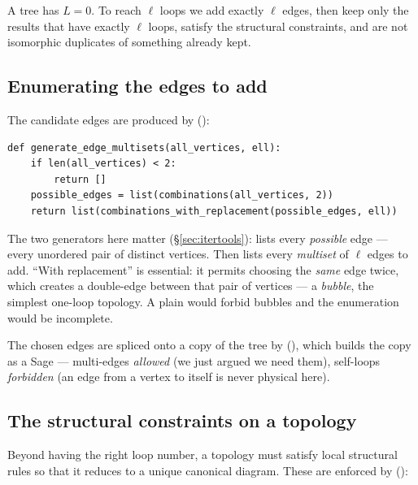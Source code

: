 A tree has $L=0$. To reach $\ell$ loops we add exactly $\ell$ edges, then keep
only the results that have exactly $\ell$ loops, satisfy the structural
constraints, and are not isomorphic duplicates of something already kept.

\subsection{Enumerating the edges to add}

The candidate edges are produced by 
():

\begin{lstlisting}
def generate_edge_multisets(all_vertices, ell):
    if len(all_vertices) < 2:
        return []
    possible_edges = list(combinations(all_vertices, 2))
    return list(combinations_with_replacement(possible_edges, ell))
\end{lstlisting}

The two  generators here matter (\S\ref{sec:itertools}):
 lists every \emph{possible} edge --- every
unordered pair of distinct vertices. Then
 lists every
\emph{multiset} of $\ell$ edges to add. ``With replacement'' is essential: it
permits choosing the \emph{same} edge twice, which creates a double-edge between
that pair of vertices --- a \emph{bubble}, the simplest one-loop topology. A
plain  would forbid bubbles and the enumeration would be
incomplete.

The chosen edges are spliced onto a copy of the tree by 
(), which builds the copy as a Sage
 --- multi-edges \emph{allowed}
(we just argued we need them), self-loops \emph{forbidden} (an edge from a vertex
to itself is never physical here).

\subsection{The structural constraints on a topology}

Beyond having the right loop number, a topology must satisfy local structural
rules so that it reduces to a unique canonical diagram. These are enforced by
():

